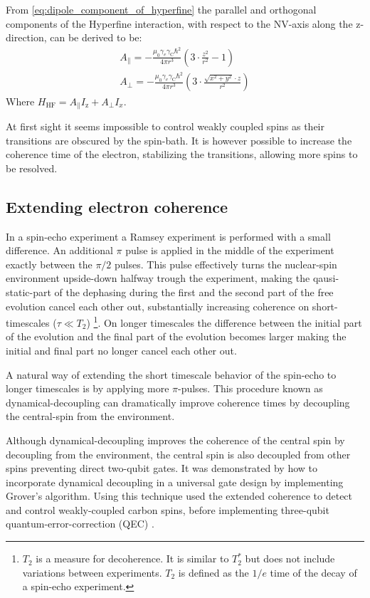 From \cref{eq:dipole_component_of_hyperfine}  the parallel and orthogonal components of the Hyperfine interaction, with respect to the NV-axis along the z-direction, can be derived to be:
 \begin{align}
A_\parallel= - \frac{\mu_0 \gamma_e \gamma_{\mathrm{C}} \hbar^2 }{4 \pi r^3} \left(3\cdot \frac{z^2}{r^2}-1\right)\\
 A_\perp =  -\frac{\mu_0 \gamma_e \gamma_{\mathrm{C}} \hbar^2 }{4 \pi r^3}\left( 3\cdot\frac{\sqrt{x^2+y^2}\cdot z}{r^2}\right)
\end{align}
Where $H_{\mathrm{HF}} = A_\parallel I_\mathrm{z} + A_\perp I_x $.

At first sight it seems impossible to control weakly coupled spins as their transitions are obscured by the spin-bath.
It is however possible to increase the coherence time of the electron, stabilizing the transitions, allowing more spins to be resolved.

\subsection{Extending electron coherence}
In a spin-echo experiment a Ramsey experiment is performed with a small difference. An additional $\pi$ pulse is applied in the middle of the experiment exactly between the $\pi/2$ pulses. This pulse effectively turns the nuclear-spin environment upside-down halfway trough the experiment, making the qausi-static-part of the dephasing during the first and the second part of the free evolution cancel each other out, substantially increasing coherence on short-timescales ($\tau \ll T_2 $)
\footnote{ $T_2$ is a measure for decoherence. It is similar to $T_2^*$ but does not include variations between experiments. $T_2$ is defined as the $1/e$ time of the decay of a spin-echo experiment.}.
On longer timescales the difference between the initial part of the evolution and the final part of the evolution becomes larger making the initial and final part no longer cancel each other out.

A natural way of extending the short timescale behavior of the spin-echo to longer timescales is by applying more $\pi$-pulses. This procedure known as dynamical-decoupling can dramatically improve coherence times by decoupling the central-spin from the environment\citep{Lange2010Universal}.

Although dynamical-decoupling improves the coherence of the central spin by decoupling from the environment, the central spin is also decoupled from other spins preventing direct two-qubit gates. It was demonstrated by \citet{Sar2012DecoherenceProtected} how to incorporate dynamical decoupling in a universal gate design by implementing Grover's algorithm.
Using this technique \citet{Taminiau2012Detection} used the extended coherence to detect and control weakly-coupled carbon spins, before implementing three-qubit quantum-error-correction (QEC) \citep{Taminiau2014Universal}.

